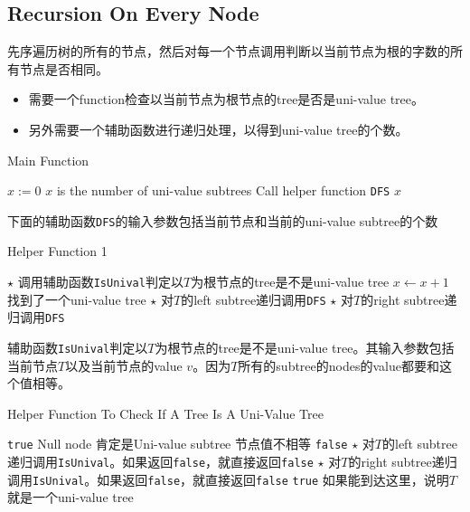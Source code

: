 \subsection{Recursion On Every Node}
先序遍历树的所有的节点，然后对每一个节点调用判断以当前节点为根的字数的所有节点是否相同。
\begin{itemize}
\item 需要一个function检查以当前节点为根节点的tree是否是uni-value tree。
\item 另外需要一个辅助函数进行递归处理，以得到uni-value tree的个数。
\end{itemize}
\setcounter{algorithm}{0}
\begin{algorithm}[H]
\caption{Main Function}
\begin{algorithmic}[1]
\State $x:=0$ \Comment $x$ is the number of uni-value subtrees
\State {} \Comment Call helper function \texttt{DFS}
\State \Return $x$
\EndProcedure
\end{algorithmic}
\end{algorithm}
下面的辅助函数\texttt{DFS}的输入参数包括当前节点和当前的uni-value subtree的个数
\begin{algorithm}[H]
\caption{Helper Function 1}
\begin{algorithmic}[1]
\State \Return
\EndIf
\State $\star$ 调用辅助函数\texttt{IsUnival}判定以$T$为根节点的tree是不是uni-value tree
\State $x\gets x+1$ \Comment 找到了一个uni-value tree
\EndIf
\State $\star$ 对$T$的left subtree递归调用\texttt{DFS}
\State $\star$ 对$T$的right subtree递归调用\texttt{DFS}
\EndProcedure
\end{algorithmic}
\end{algorithm}
辅助函数\texttt{IsUnival}判定以$T$为根节点的tree是不是uni-value tree。其输入参数包括当前节点$T$以及当前节点的value $v$。因为$T$所有的subtree的nodes的value都要和这个值相等。
\begin{algorithm}[H]
\caption{Helper Function To Check If A Tree Is A Uni-Value Tree}
\begin{algorithmic}[1]
\State \Return \texttt{true} \Comment Null node 肯定是Uni-value subtree
\EndIf
{} \Comment 节点值不相等
\State \Return \texttt{false}
\EndIf
\State $\star$ 对$T$的left subtree递归调用\texttt{IsUnival}。如果返回\texttt{false}，就直接返回\texttt{false}
\State $\star$ 对$T$的right subtree递归调用\texttt{IsUnival}。如果返回\texttt{false}，就直接返回\texttt{false}
\State \Return \texttt{true} \Comment 如果能到达这里，说明$T$就是一个uni-value tree
\EndProcedure
\end{algorithmic}
\end{algorithm}
